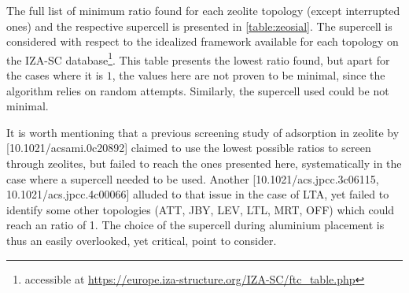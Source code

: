 \documentclass[main.tex]{subfiles}
\begin{document}
The full list of minimum \SiAl ratio found for each zeolite topology (except interrupted ones) and the respective supercell is presented in \cref{table:zeosial}. The supercell is considered with respect to the idealized framework available for each topology on the IZA-SC database\footnote{accessible at \url{https://europe.iza-structure.org/IZA-SC/ftc_table.php}}. This table presents the lowest \SiAl ratio found, but apart for the cases where it is $1$, the values here are not proven to be minimal, since the algorithm relies on random attempts. Similarly, the supercell used could be not minimal.

It is worth mentioning that a previous screening study of adsorption in zeolite by [10.1021/acsami.0c20892] claimed to use the lowest possible \SiAl ratios to screen through zeolites, but failed to reach the ones presented here, systematically in the case where a supercell needed to be used. Another [10.1021/acs.jpcc.3c06115, 10.1021/acs.jpcc.4c00066] alluded to that issue in the case of LTA, yet failed to identify some other topologies (ATT, JBY, LEV, LTL, MRT, OFF) which could reach an \SiAl ratio of 1. The choice of the supercell during aluminium placement is thus an easily overlooked, yet critical, point to consider.
\end{document}
